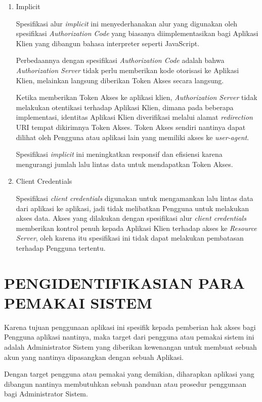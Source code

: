 \documentclass[pdftex,12pt, oneside]{article}
\begin{document}
\begin{enumerate}
	\item Implicit
	
	Spesifikasi alur \textit{implicit} ini menyederhanakan alur yang digunakan oleh spesifikasi \textit{Authorization Code} yang biasanya diimplementasikan bagi Aplikasi Klien yang dibangun bahasa interpreter seperti JavaScript.
	
	Perbedaannya dengan spesifikasi \textit{Authorization Code} adalah bahwa \textit{Authorization Server} tidak perlu memberikan kode otorisasi ke Aplikasi Klien, melainkan langsung diberikan Token Akses secara langsung.
	
	Ketika memberikan Token Akses ke aplikasi klien, \textit{Authorization Server} tidak melakukan otentikasi terhadap Aplikasi Klien, dimana pada beberapa implementasi, identitas Aplikasi Klien diverifikasi melalui alamat \textit{redirection} URI tempat dikirimnya Token Akses. Token Akses sendiri nantinya dapat dilihat oleh Pengguna atau aplikasi lain yang memiliki akses ke \textit{user-agent}.
	
	Spesifikasi \textit{implicit} ini meningkatkan responsif dan efisiensi karena mengurangi jumlah lalu lintas data untuk mendapatkan Token Akses.
	
	\item Client Credentials
	
	Spesifikasi \textit{client credentials} digunakan untuk mengamankan lalu lintas data dari aplikasi ke aplikasi, jadi tidak melibatkan Pengguna untuk melakukan akses data. Akses yang dilakukan dengan spesifikasi alur \textit{client credentials} memberikan kontrol penuh kepada Aplikasi Klien terhadap akses ke \textit{Resource Server}, oleh karena itu spesifikasi ini tidak dapat melakukan pembatasan terhadap Pengguna tertentu.

\end{enumerate}

\section{PENGIDENTIFIKASIAN PARA PEMAKAI SISTEM}

Karena tujuan penggunaan aplikasi ini spesifik kepada pemberian hak akses bagi Pengguna aplikasi nantinya, maka target dari pengguna atau pemakai sistem ini adalah Administrator Sistem yang diberikan kewenangan untuk membuat sebuah akun yang nantinya dipasangkan dengan sebuah Aplikasi.

Dengan target pengguna atau pemakai yang demikian, diharapkan aplikasi yang dibangun nantinya membutuhkan sebuah panduan atau prosedur penggunaan bagi Administrator Sistem.
\end{document}
